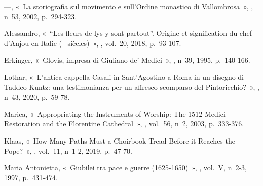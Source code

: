 \begin{teiElement}[name={TEI},change={commons\_edition}]
\begin{teiElement}[name={text},type={book},xmlid={book}]
\begin{teiElement}[name={group},type={book},xmlid={book-001}]
\begin{teiElement}[name={group},type={bibliography},data-page-title={Sources et bibliographie},data-include-href={Ch14\_Source\_bibliographie.xml},xmlid={bibliography-001}]
\begin{teiElement}[name={body}]
\begin{teiDiv}[type={section1},xmlid={div18}]
\begin{teiDiv}[type={section2},xmlid={div20}]
\begin{teiBibl}[xmlid={bibl-496}]
\end{teiBibl}
              \begin{teiBibl}[xmlid={bibl-497}]
—, « La storiografia sul movimento e sull’Ordine monastico di Vallombrosa », , n 53, 2002, p. 294-323.
\end{teiBibl}
              \begin{teiBibl}[xmlid={bibl-498}]
 Alessandro, « “Les fleurs de lys y sont partout”. Origine et signification du chef d’Anjou en Italie (- siècles) », , vol. 20, 2018, p. 93-107.
\end{teiBibl}
              \begin{teiBibl}[xmlid={bibl-499}]
 Erkinger, « Glovis, impresa di Giuliano de’ Medici », , n 39, 1995, p. 140-166.
\end{teiBibl}
              \begin{teiBibl}[xmlid={bibl-500}]
 Lothar, « L’antica cappella Casali in Sant’Agostino a Roma in un disegno di Taddeo Kuntz: una testimonianza per un affresco scomparso del Pintoricchio? », , n 43, 2020, p. 59-78.
\end{teiBibl}
              \begin{teiBibl}[xmlid={bibl-501}]
 Marica, « Appropriating the Instruments of Worship: The 1512 Medici Restoration and the Florentine Cathedral », , vol. 56, n 2, 2003, p. 333-376.
\end{teiBibl}
              \begin{teiBibl}[xmlid={bibl-502}]
 Klaas, « How Many Paths Must a Choirbook Tread Before it Reaches the Pope? », , vol. 11, n 1‑2, 2019, p. 47‑70.
\end{teiBibl}
              \begin{teiBibl}[xmlid={bibl-503}]
 Maria Antonietta, « Giubilei tra pace e guerre (1625-1650) », , vol. V, n 2-3, 1997, p. 431-474.

\end{teiBibl}
\end{teiDiv}
\end{teiDiv}
\end{teiElement}
\end{teiElement}
\end{teiElement}
\end{teiElement}
\end{teiElement}
